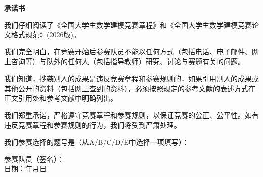 \begin{center}
    {\LARGE \textbf{承\hspace{1em}诺\hspace{1em}书}}
\end{center}

\vspace{2cm}

我们仔细阅读了《全国大学生数学建模竞赛章程》和《全国大学生数学建模竞赛论文格式规范》(2026版)。

我们完全明白，在竞赛开始后参赛队员不能以任何方式（包括电话、电子邮件、网上咨询等）与队外的任何人（包括指导教师）研究、讨论与赛题有关的问题。

我们知道，抄袭别人的成果是违反竞赛章程和参赛规则的，如果引用别人的成果或其他公开的资料（包括网上查到的资料），必须按照规定的参考文献的表述方式在正文引用处和参考文献中明确列出。

我们郑重承诺，严格遵守竞赛章程和参赛规则，以保证竞赛的公正、公平性。如有违反竞赛章程和参赛规则的行为，我们将受到严肃处理。

\vspace{2cm}

我们参赛选择的题号是（从A/B/C/D/E中选择一项填写）：\underline{\hspace{3cm}}

\vspace{1cm}

\begin{flushright}
    参赛队员（签名）：\underline{\hspace{2cm}} \\
    \vspace{0.5cm}
    日期：\underline{\hspace{2cm}}年\underline{\hspace{1cm}}月\underline{\hspace{1cm}}日
\end{flushright}

